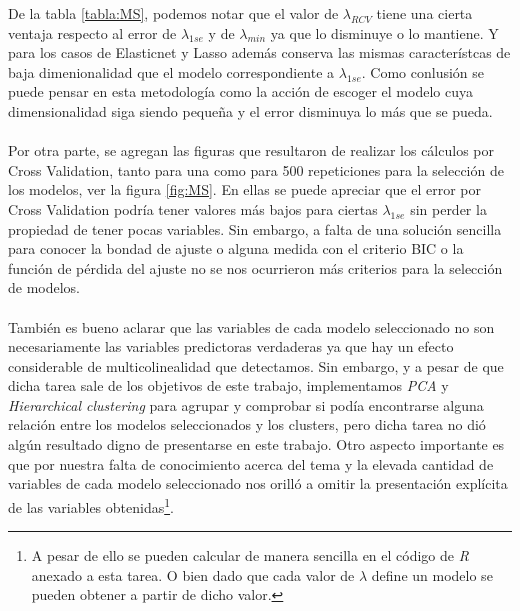 \documentclass[11pt]{article}
\begin{document}
De la tabla \ref{tabla:MS}, podemos notar que el valor de $\lambda_{RCV}$ tiene una cierta ventaja respecto al error de $\lambda_{1se}$ y de $\lambda_{min}$ ya que lo disminuye o lo mantiene. Y para los casos de Elasticnet y Lasso además conserva las mismas característcas de baja dimenionalidad que el modelo correspondiente a $\lambda_{1se}$. Como conlusión se puede pensar en esta metodología como la acción de escoger el modelo cuya dimensionalidad siga siendo pequeña y el error disminuya lo más que se pueda.
\\
\\Por otra parte, se agregan las figuras que resultaron de realizar los cálculos por Cross Validation, tanto para una como para 500 repeticiones para la selección de los modelos, ver la figura \ref{fig:MS}. En ellas se puede apreciar que el error por Cross Validation podría tener valores más bajos para ciertas $\lambda_{1se}$ sin perder la propiedad de tener pocas variables. Sin embargo, a falta de una solución sencilla para conocer la bondad de ajuste o alguna medida con el criterio BIC o la función de pérdida del ajuste no se nos ocurrieron más criterios para la selección de modelos.
\\
\\También es bueno aclarar que las variables de cada modelo seleccionado no son necesariamente las variables predictoras verdaderas ya que hay un efecto considerable de multicolinealidad que detectamos. Sin embargo, y a pesar de que dicha tarea sale de los objetivos de este trabajo, implementamos \emph{PCA} y \emph{Hierarchical clustering} para agrupar y comprobar si podía encontrarse alguna relación entre los modelos seleccionados y los clusters, pero dicha tarea no dió algún resultado digno de presentarse en este trabajo. Otro aspecto importante es que por nuestra falta de conocimiento acerca del tema y la elevada cantidad de variables de cada modelo seleccionado nos orilló a omitir la presentación explícita de las variables obtenidas\footnote{A pesar de ello se pueden calcular de manera sencilla en el código de \emph{R} anexado a esta tarea. O bien dado que cada valor de $\lambda$ define un modelo se pueden obtener a partir de dicho valor.}. 
\end{document}
